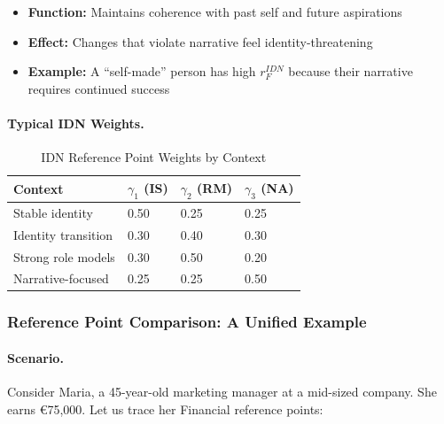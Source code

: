 \begin{itemize}
\item \textbf{Function:} Maintains coherence with past self and future aspirations
\item \textbf{Effect:} Changes that violate narrative feel identity-threatening
\item \textbf{Example:} A ``self-made'' person has high $r^{IDN}_F$ because their 
narrative requires continued success
\end{itemize}

\paragraph{Typical IDN Weights.}

\begin{table}[htbp]
\centering
\caption{IDN Reference Point Weights by Context}
\label{tab:idn-weights}
\renewcommand{\arraystretch}{1.3}
\begin{tabular}{@{}llll@{}}
\toprule
\textbf{Context} & $\gamma_1$ (IS) & $\gamma_2$ (RM) & $\gamma_3$ (NA) \\
\midrule
Stable identity & 0.50 & 0.25 & 0.25 \\
Identity transition & 0.30 & 0.40 & 0.30 \\
Strong role models & 0.30 & 0.50 & 0.20 \\
Narrative-focused & 0.25 & 0.25 & 0.50 \\
\bottomrule
\end{tabular}
\end{table}

\subsubsection{Reference Point Comparison: A Unified Example}

\paragraph{Scenario.}
Consider Maria, a 45-year-old marketing manager at a mid-sized company.
She earns \euro{75,000}. Let us trace her Financial reference points:

